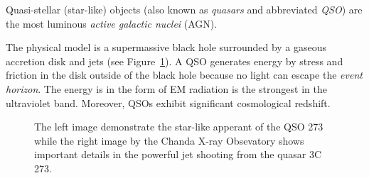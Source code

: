 Quasi-stellar (star-like) objects (also known as \textit{quasars} and abbreviated \textit{QSO}) are the most luminous \textit{active galactic nuclei} (AGN).~\cite{beckmann2013}

The physical model is a supermassive black hole surrounded by a gaseous accretion disk and jets (see Figure~\ref{3c_273}).
A QSO generates energy by stress and friction in the disk outside of the black hole because no light can escape the \textit{event horizon}.
The energy is in the form of EM radiation is the strongest in the ultraviolet band.
Moreover, QSOs exhibit significant cosmological redshift.

\begin{figure}
\begin{center}
\quad
{}
\end{center}
\caption[Image and jet of the quasar 3C 273]{
	The left image demonstrate the star-like apperant of the QSO 273
	while the right image by the Chanda X-ray Obsevatory shows important details in the powerful jet shooting from the quasar 3C 273.
}
\label{3c_273}
\end{figure}

